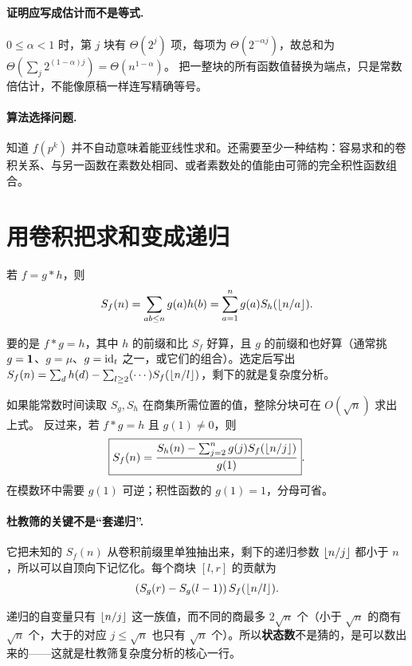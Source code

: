 \paragraph{证明应写成估计而不是等式.}
$0\le\alpha<1$ 时，第 $j$ 块有 $\Theta(2^j)$ 项，每项为 $\Theta(2^{-\alpha j})$，故总和为 $\Theta(\sum_j2^{(1-\alpha)j})=\Theta(n^{1-\alpha})$。
把一整块的所有函数值替换为端点，只是常数倍估计，不能像原稿一样连写精确等号。
\paragraph{算法选择问题.} 知道 $f(p^k)$ 并不自动意味着能亚线性求和。还需要至少一种结构：容易求和的卷积关系、与另一函数在素数处相同、或者素数处的值能由可筛的完全积性函数组合。


\section{用卷积把求和变成递归}
若 $f=g*h$，则
\[
S_f(n)=\sum_{ab\le n}g(a)h(b)
=\sum_{a=1}^n g(a)S_h(\left\lfloor n/a\right\rfloor).
\]

\begin{tip}[选 $g$ 的原则]
要的是 $f*g=h$，其中 $h$ 的前缀和比 $S_f$ 好算，且 $g$ 的前缀和也好算（通常挑 $g=\mathbf 1$、$g=\mu$、$g=\operatorname{id}_t$ 之一，或它们的组合）。选定后写出 $S_f(n)=\sum_{d}h(d)-\sum_{l\ge2}(\cdots)S_f(\left\lfloor n/l\right\rfloor)$，剩下的就是复杂度分析。
\end{tip}

如果能常数时间读取 $S_g,S_h$ 在商集所需位置的值，整除分块可在 $O(\sqrt n)$ 求出上式。
反过来，若 $f*g=h$ 且 $g(1)\ne0$，则
\[
\boxed{S_f(n)=\frac{S_h(n)-\sum_{j=2}^n g(j)S_f(\left\lfloor n/j\right\rfloor)}{g(1)}}.
\]
在模数环中需要 $g(1)$ 可逆；积性函数的 $g(1)=1$，分母可省。


\paragraph{杜教筛的关键不是“套递归”.}
它把未知的 $S_f(n)$ 从卷积前缀里单独抽出来，剩下的递归参数 $\left\lfloor n/j\right\rfloor$ 都小于 $n$，所以可以自顶向下记忆化。每个商块 $[l,r]$ 的贡献为
\[
 (S_g(r)-S_g(l-1))\,S_f(\left\lfloor n/l\right\rfloor).
\]

\begin{tip}[记忆化为什么够用]
递归的自变量只有 $\left\lfloor n/j\right\rfloor$ 这一族值，而不同的商最多 $2\sqrt n$ 个（小于 $\sqrt n$ 的商有 $\sqrt n$ 个，大于的对应 $j\le\sqrt n$ 也只有 $\sqrt n$ 个）。所以\textbf{状态数}不是猜的，是可以数出来的——这就是杜教筛复杂度分析的核心一行。
\end{tip}


